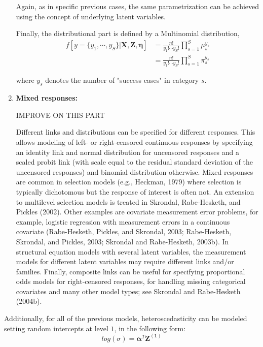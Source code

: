 \begin{enumerate}
{	Again, as in specific previous cases, the same parametrization can be achieved using the concept of underlying latent variables.
	
	Finally, the distributional part is defined by a Multinomial distribution,
	\begin{equation} \label{eq:dist_rank}
		\begin{split}
			f[y=\{y_{1}, \cdots, y_{S}\} | \mathbf{X}, \mathbf{Z}, \pmb{\eta}] &= \frac{n!}{y_{1}! \cdots y_{S}!} \prod_{s=1}^{S} \mu_{s}^{y_{s}} \\
			&= \frac{n!}{y_{1}! \cdots y_{S}!} \prod_{s=1}^{S} \pi_{s}^{y_{s}}
		\end{split}
	\end{equation}
	
	where $y_{s}$ denotes the number of "success cases" in category $s$.
	}


		
	\item \textbf{Mixed responses:} \\
	{\color{red} IMPROVE ON THIS PART
	
	Different links and distributions can be specified for different responses. This allows modeling of left- or right-censored continuous responses by specifying an identity link and normal distribution for uncensored responses and a scaled probit link (with scale equal to the residual standard deviation of the uncensored responses) and binomial distribution otherwise. Mixed responses are common in selection models (e.g., Heckman, 1979) where selection is typically dichotomous but the response of interest is often not. An extension to multilevel selection models is treated in Skrondal, Rabe-Hesketh, and Pickles (2002). Other examples are covariate measurement error problems, for example, logistic regression with measurement errors in a continuous covariate (Rabe-Hesketh, Pickles, and Skrondal, 2003; Rabe-Hesketh, Skrondal, and Pickles, 2003; Skrondal and Rabe-Hesketh, 2003b). In structural equation models with several latent variables, the measurement models for different latent variables may require different links and/or families. Finally, composite links can be useful	for specifying proportional odds models for right-censored responses, for handling missing categorical covariates and many other model types; see Skrondal and Rabe-Hesketh (2004b).
	}


\end{enumerate}

\noindent Additionally, for all of the previous models, heteroscedasticity can be modeled setting random intercepts at level $1$, in the following form:
\begin{equation} \label{eq:het_cont}
	log(\sigma) = \pmb{\alpha}^{T}\mathbf{Z^{(1)}}
\end{equation}

